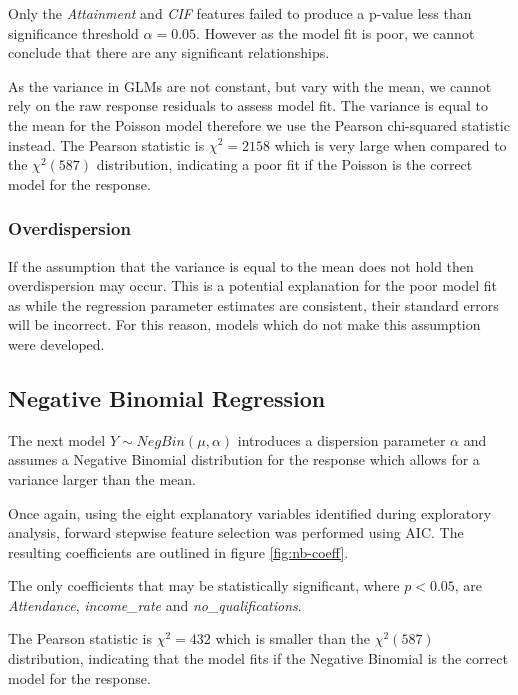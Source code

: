 \documentclass{thesis}
\begin{document}
Only the \textit{Attainment} and \textit{CIF} features failed to produce a p-value less than significance threshold $\alpha = 0.05$. However as the model fit is poor, we cannot conclude that there are any significant relationships.

As the variance in GLMs are not constant, but vary with the mean, we cannot rely on the raw response residuals to assess model fit. The variance is equal to the mean for the Poisson model therefore we use the Pearson chi-squared statistic instead. The Pearson statistic is $\chi^2 = 2158$ which is very large when compared to the $\chi^2(587)$ distribution, indicating a poor fit if the Poisson is the correct model for the response.

\subsubsection{Overdispersion}

If the assumption that the variance is equal to the mean does not hold then overdispersion may occur. This is a potential explanation for the poor model fit as while the regression parameter estimates are consistent, their standard errors will be incorrect. For this reason, models which do not make this assumption were developed.

\subsection{Negative Binomial Regression}

The next model $Y \sim NegBin(\mu, \alpha)$ introduces a dispersion parameter $\alpha$ and assumes a Negative Binomial distribution for the response which allows for a variance larger than the mean.

Once again, using the eight explanatory variables identified during exploratory analysis, forward stepwise feature selection was performed using AIC. The resulting coefficients are outlined in figure \ref{fig:nb-coeff}.

The only coefficients that may be statistically significant, where $p < 0.05$, are \textit{Attendance}, \textit{income\_rate} and \textit{no\_qualifications}.

The Pearson statistic is $\chi^2 = 432$ which is smaller than the $\chi^2(587)$ distribution, indicating that the model fits if the Negative Binomial is the correct model for the response.
\end{document}
